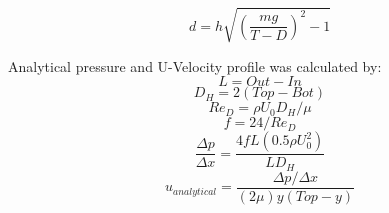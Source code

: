 \documentclass[10pt,english]{article}
\begin{document}
        \begin{equation}    
d = h \sqrt{(\frac{m g}{T-D})^2-1}
    \end{equation}

\noindent Analytical pressure and U-Velocity profile was calculated by:
\begin{equation}
            L = Out-In
\end{equation}
\begin{equation}
            D_H = 2 (Top-Bot)
            \end{equation}
            \begin{equation}
            Re_D = \rho U_0 D_H / \mu
            \end{equation}
            \begin{equation}
            f = 24/Re_D
            \end{equation}
            \begin{equation}
            \frac{\Delta p}{\Delta x} = \frac{4 f L (0.5 \rho U_0^2)}{L D_H}
            \end{equation}
            \begin{equation}
            u_{analytical} = \frac{{\Delta p}/{\Delta x}}{(2 \mu) y (Top-y)}
            \end{equation}
\end{document}
